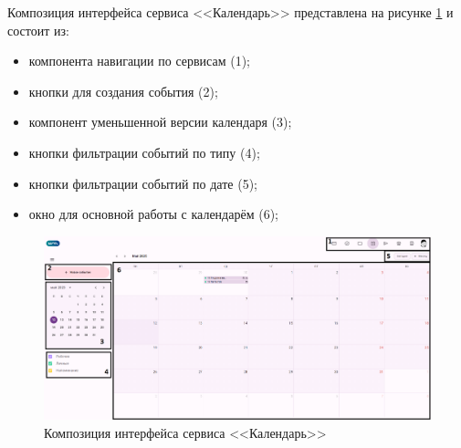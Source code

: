 Композиция интерфейса сервиса <<Календарь>> представлена на рисунке \ref{templ:image3} и состоит из:
\begin{itemize}
  \item компонента навигации по сервисам (1);
  \item кнопки для создания события (2);
  \item компонент уменьшенной версии календаря (3);
  \item кнопки фильтрации событий по типу (4);
  \item кнопки фильтрации событий по дате (5);
  \item окно для основной работы с календарём (6);
\end{itemize}
\begin{figure}[H]
	\centering
	\includegraphics[width=1\linewidth]{images/календарь}
	\caption{Композиция интерфейса сервиса <<Календарь>>}
	\label{templ:image3}
\end{figure}

